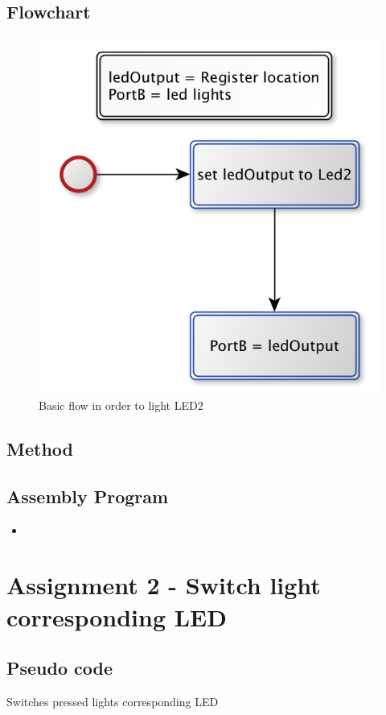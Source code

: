 \documentclass[a4paper, 12pt]{article}
\newcommand{\avrasm}[2]{
\begin{itemize}
\item[]
\end{itemize}
}
\begin{document}
\subsection{Flowchart}
\begin{figure}[h]
\centering
\includegraphics[scale=0.5]{Flowchart_pics/assignment1_pic.png} 
\caption{Basic flow in order to light LED2}
\label{assign1.flow}
\end{figure}

\subsection{Method}


\newpage
\subsection{Assembly Program}
\avrasm{../src/a1.asm}{}
\newpage

\section{Assignment 2 - Switch light corresponding LED}


\subsection{Pseudo code}
\begin{algorithm}
\begin{algorithmic}
\Repeat
{} 
\Until{$\infty$}
\EndProcedure
\caption{Switches pressed lights corresponding LED}
\label{assign2.pseudo}
\end{algorithmic}
\end{algorithm}
\end{document}
